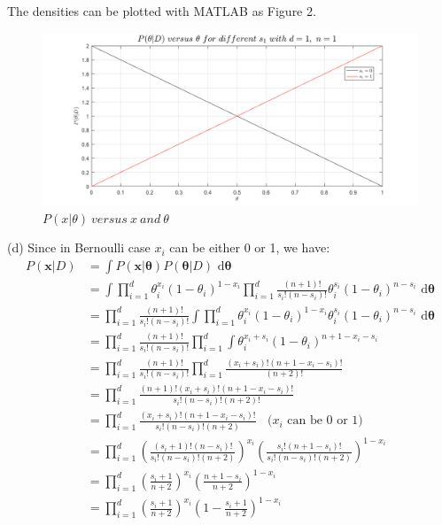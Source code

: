 \documentclass[12pt]{article}
\begin{document}
The densities can be plotted with MATLAB as Figure 2.
\begin{figure}[H]
\centering
\includegraphics[width = 1\textwidth]{pb317.png}
\caption{\label{fig3}$P(x|\theta)\ versus\ x\ and\ \theta$}
\end{figure}
\noindent(d) Since in Bernoulli case $x_i$ can be either 0 or 1, we have:
\begin{equation*}
\begin{aligned}
P(\bm{x}|D) &= \int P(\bm{x}|\bm{\theta}) P(\bm{\theta}|D)\text{ d}\bm{\theta}\\ 
&=\int \prod_{i=1}^d\theta_i^{x_i}(1-\theta_i)^{1-x_i}\prod_{i=1}^{d} \frac{(n+1)!}{s_i!(n-s_i)!}\theta_i^{s_i}(1-\theta_i)^{n-s_i} \text{ d}\bm{\theta}\\
&=\prod_{i=1}^d  \frac{(n+1)!}{s_i!(n-s_i)!} \int \prod_{i=1}^d\theta_i^{x_i}(1-\theta_i)^{1-x_i} \theta_i^{s_i}(1-\theta_i)^{n-s_i} \text{ d}\bm{\theta}\\
&=\prod_{i=1}^d  \frac{(n+1)!}{s_i!(n-s_i)!} \prod_{i=1}^d \int \theta_i^{x_i+s_i}(1-\theta_i)^{n+1-x_i-s_i} \\
&=\prod_{i=1}^d  \frac{(n+1)!}{s_i!(n-s_i)!} \prod_{i=1}^d  \frac{(x_i+s_i)!(n+1-x_i-s_i)!}{(n+2)!} \\
&=\prod_{i=1}^d  \frac{(n+1)!(x_i+s_i)!(n+1-x_i-s_i)!}{s_i!(n-s_i)!(n+2)!} \\
&=\prod_{i=1}^d  \frac{(x_i+s_i)!(n+1-x_i-s_i)!}{s_i!(n-s_i)!(n+2)} \ \ \ \ \text{($x_i$ can be 0 or 1)}\\
&=\prod_{i=1}^d  (\frac{(s_i+1)!(n-s_i)!}{s_i!(n-s_i)!(n+2)})^{x_i} (\frac{s_i!(n+1-s_i)!}{s_i!(n-s_i)!(n+2)})^{1-x_i} \\
&=\prod_{i=1}^d  (\frac{s_i+1}{n+2})^{x_i} (\frac{n+1-s_i}{n+2})^{1-x_i} \\
&=\prod_{i=1}^d  (\frac{s_i+1}{n+2})^{x_i} (1-\frac{s_i+1}{n+2})^{1-x_i}
\end{aligned}
\end{equation*}
\end{document}
